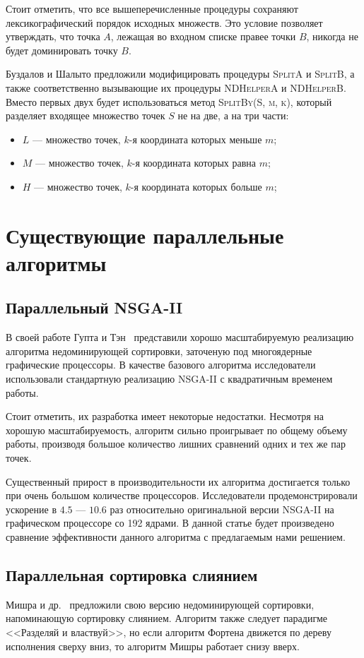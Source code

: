 Стоит отметить, что все вышеперечисленные процедуры сохраняют лексикографический порядок исходных множеств.
Это условие позволяет утверждать, что точка $A$, лежащая во входном списке правее точки $B$, никогда не будет доминировать точку $B$.

Буздалов и Шалыто предложили модифицировать процедуры \textsc{SplitA} и \textsc{SplitB}, а также соответственно вызывающие их процедуры \textsc{NDHelperA} и \textsc{NDHelperB}.
Вместо первых двух будет использоваться метод \textsc{SplitBy(S, m, k)}, который разделяет входящее множество точек $S$ не на две, а на три части:
\begin{itemize}
    \item $L$ --- множество точек, $k$-я координата которых меньше $m$;
    \item $M$ --- множество точек, $k$-я координата которых равна $m$;
    \item $H$ --- множество точек, $k$-я координата которых больше $m$;
\end{itemize}



\section{Существующие параллельные алгоритмы}
\subsection{Параллельный NSGA-II}
В своей работе Гупта и Тэн~\cite{gupta15} представили хорошо масштабируемую реализацию алгоритма недоминирующей сортировки, заточеную под многоядерные графические процессоры.
В качестве базового алгоритма исследователи использовали стандартную реализацию NSGA-II с квадратичным временем работы.

Стоит отметить, их разработка имеет некоторые недостатки.
Несмотря на хорошую масштабируемость, алгоритм сильно проигрывает по общему объему работы, производя большое количество лишних сравнений одних и тех же пар точек.

Существенный прирост в производительности их алгоритма достигается только при очень большом количестве процессоров. 
Исследователи продемонстрировали ускорение в $4.5$ --- $10.6$ раз относительно оригинальной версии NSGA-II на графическом процессоре со 192 ядрами.
В данной статье будет произведено сравнение эффективности данного алгоритма с предлагаемым нами решением.

\subsection{Параллельная сортировка слиянием}
Мишра и др.~\cite{mishra16} предложили свою версию недоминирующей сортировки, напоминающую сортировку слиянием.
Алгоритм также следует парадигме <<Разделяй и властвуй>>, но если алгоритм Фортена движется по дереву исполнения сверху вниз, то алгоритм Мишры работает снизу вверх.

